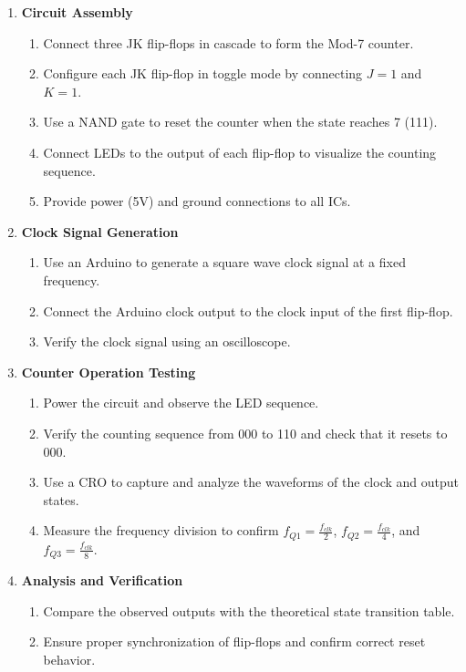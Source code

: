 \documentclass[a4paper,12pt]{article}
\begin{document}
\begin{enumerate}
    \item \textbf{Circuit Assembly}
    \begin{enumerate}
        \item Connect three JK flip-flops in cascade to form the Mod-7 counter.
        \item Configure each JK flip-flop in toggle mode by connecting \( J = 1 \) and \( K = 1 \).
        \item Use a NAND gate to reset the counter when the state reaches 7 (111).
        \item Connect LEDs to the output of each flip-flop to visualize the counting sequence.
        \item Provide power (5V) and ground connections to all ICs.
    \end{enumerate}

    \item \textbf{Clock Signal Generation}
    \begin{enumerate}
        \item Use an Arduino to generate a square wave clock signal at a fixed frequency.
        \item Connect the Arduino clock output to the clock input of the first flip-flop.
        \item Verify the clock signal using an oscilloscope.
    \end{enumerate}

    \item \textbf{Counter Operation Testing}
    \begin{enumerate}
        \item Power the circuit and observe the LED sequence.
        \item Verify the counting sequence from 000 to 110 and check that it resets to 000.
        \item Use a CRO to capture and analyze the waveforms of the clock and output states.
        \item Measure the frequency division to confirm \( f_{Q1} = \frac{f_{clk}}{2} \), \( f_{Q2} = \frac{f_{clk}}{4} \), and \( f_{Q3} = \frac{f_{clk}}{8} \).
    \end{enumerate}

    \item \textbf{Analysis and Verification}
    \begin{enumerate}
        \item Compare the observed outputs with the theoretical state transition table.
        \item Ensure proper synchronization of flip-flops and confirm correct reset behavior.
    \end{enumerate}
\end{enumerate}
\end{document}
